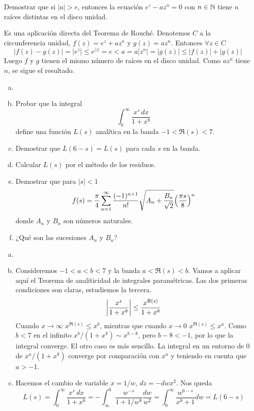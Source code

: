 \documentclass[twoside]{article}
\begin{document}
\begin{ejercicio}{6}
Demostrar que si $|a|>e$, entonces la ecuación $e^z-az^n=0$ con $n\in\mathbb{N}$ tiene $n$ raíces distintas en el disco unidad. 
\end{ejercicio}
\begin{solucion}
Es una aplicación directa del Teorema de Rouché. Denotemos $C$ a la circunferencia unidad, $f(z)=e^z+az^n$ y $g(z)=az^n$. Entonces $\forall z \in C$
$$
|f(z)-g(z)| = |e^z| \leq e^{|z|}=e < a = a|z^n| = |g(z)| \leq |f(z)|+|g(z)|
$$
Luego $f$ y $g$ tienen el mismo número de raíces en el disco unidad. Como $az^n$ tiene $n$, se sigue el resultado.
\end{solucion}
\newpage
\begin{ejercicio}{7}
\begin{enumerate}[a)]
\item[]
\item Probar que la integral
\[\int_0^\infty \frac{x^s\,dx}{1+x^8}\]
define una función $L(s)$ analítica en la banda $-1<\Re(s)<7$.
\item Demostrar que $L(6-s)=L(s)$ para cada $s$ en la banda.
\item Calcular $L(s)$ por el método de los residuos.
\item Demostrar que para $|s|<1$ 
\[f(s)=\frac{\pi}{4}\sum_{n=1}^\infty \frac{(-1)^{n+1}}{n!}\sqrt{A_n+\frac{B_n}{\sqrt{2}}}
\Bigl(\frac{\pi s}{8}\Bigr)^n\]
donde $A_n$ y $B_n$ son números naturales.
\item ¿Qué son las sucesiones $A_n$ y $B_n$?
\end{enumerate}
\end{ejercicio}
\begin{solucion}
\begin{enumerate}[a)]
\item[]
\item Consideremos $-1<a<b<7$ y la banda $a<\Re(s)<b$. Vamos a aplicar aquí el Teorema de analiticidad de integrales paramétricas. Las dos primeras condiciones son claras, estudiemos la tercera.
$$
\left\lvert\frac{x^s}{1+x^8}\right\rvert \leq \frac{x^{\Re(s)}}{1+x^8}
$$
Cuando $x\to \infty$ $x^{\Re(s)}\leq x^b$, mientras que cuando $x\to 0$ $x^{\Re(s)}\leq x^a$. Como $b<7$ en el infinito $x^b/(1+x^8) \sim x^{b-8}$, pero $b-8<-1$, por lo que la integral converge. El otro caso es más sencillo. La integral en un entorno de $0$ de $x^a/(1+x^8)$ converge por comparación con $x^a$ y teniendo en cuenta que $a>-1$.
\item Hacemos el cambio de variable $x = 1/w$, $dz = -dw x^2$. Nos queda
$$
L(s)=\int_0^\infty \frac{x^s\,dx}{1+x^8} = -\int_\infty^0 \frac{w^{-s}}{1+1/w^8}\frac{dw}{w^2}= \int_0^\infty \frac{w^{6-s}}{x^8+1}dw = L(6-s)
$$

\end{enumerate}
\end{solucion}
\end{document}
